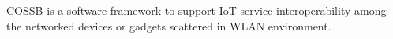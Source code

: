 C\-O\-S\-S\-B is a software framework to support Io\-T service interoperability among the networked devices or gadgets scattered in W\-L\-A\-N environment. 